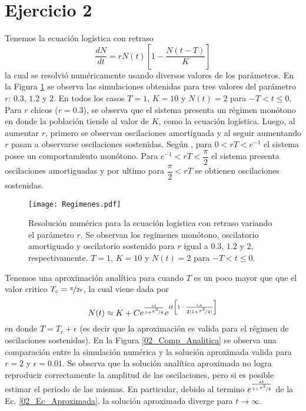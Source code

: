 \section*{Ejercicio 2}
\graphicspath{{Figuras/ej_02/}}

Tenemos la ecuación logística con retraso
\begin{equation}
    \frac{dN}{dt} = r N(t) \left[1- \frac{N(t-T)}{K}\right]
\end{equation}
la cual se resolvió numéricamente usando diversos valores de los parámetros. En la Figura \ref{02_ejercicio} se observa las simulaciones obtenidas para tres valores del parámetro $r$: $0.3$, $1.2$ y $2$. En todos los casos $T=1$, $K=10$ y $N(t)=2$ para $-T < t \leq 0$. Para $r$ chicos ($r=0.3$), se observa que el sistema presenta un régimen monótono en donde la población tiende al valor de $K$, como la ecuación logística. Luego, al aumentar $r$, primero se observan oscilaciones amortiguada y al seguir aumentando $r$ pasan a observarse oscilaciones sostenidas. Según \cite{Chule},  para $0<rT<e^{-1}$ el sistema posee un comportamiento monótono. Para $e^{-1} < rT < \dfrac{\pi}{2}$ el sistema presenta oscilaciones amortiguadas y por ultimo para $\dfrac{\pi}{2} < rT$ se obtienen oscilaciones sostenidas.

\begin{figure}[h!]
    \centering
    \texttt{[image: Regimenes.pdf]}
    \caption{Resolución numérica para la ecuación logística con retraso variando el parámetro $r$. Se observan los regímenes monótono, oscilatorio amortiguado y oscilatorio sostenido para $r$ igual a $0.3$, $1.2$ y $2$, respectivamente. $T=1$, $K=10$ y $N(t)=2$ para $-T < t \leq 0$.}
    \label{02_ejercicio}
\end{figure}

Tenemos una aproximación analítica para cuando $T$ es un poco mayor que que el valor critico $T_c = \nicefrac{\pi}{2r}$, la cual viene dada por
\begin{equation}
    N(t) \approx K + C e^{ \frac{\epsilon t}{1 + \nicefrac{\pi^{2}}{4}} } e^{it \left[ 1- \frac{\epsilon \pi}{2 ( 1 + \nicefrac{\pi^{2}}{4})} \right]}
    \label{02_Ec_Aproximada}
\end{equation}
en donde $T = T_c + \epsilon$ (es decir que la aproximación es valida para el régimen de oscilaciones sostenidas). En la Figura \ref{02_Comp_Analitica} se observa una comparación entre la simulación numérica y la solución aproximada valida para $r=2$ y $\epsilon=0.01$. Se observa que la solución analítica aproximada no logra reproducir correctamente la amplitud de las oscilaciones, pero si es posible estimar el periodo de las mismas. En particular, debido al termino $e^{ \frac{\epsilon t}{1 + \nicefrac{\pi^{2}}{4}} }$ de la Ec. \ref{02_Ec_Aproximada}, la solución aproximada diverge para $t\rightarrow \infty$.

